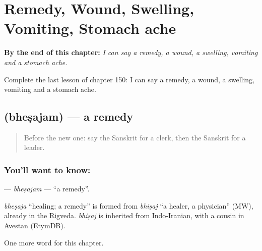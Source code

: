 
\chapter{Remedy, Wound, Swelling, Vomiting, Stomach ache}
\label{ch:sa-remedy-wound-swelling-vomiting-stomach-ache}

\begin{chapteropening}
\textbf{By the end of this chapter:} \emph{I can say a remedy, a wound, a swelling, vomiting and a stomach ache.}

Complete the last lesson of chapter 150: I can say a remedy, a wound, a swelling, vomiting and a stomach ache.
\end{chapteropening}

\section[\texorpdfstring{\sk{भेषजम्} (bheṣajam)}{भेषजम् (bheṣajam)}]{ (bheṣajam) — a remedy}

\label{lesson:SA-C150-bhesajam}



\begin{quote}
Before the new one: say the Sanskrit for a clerk, then the Sanskrit for a leader.
\end{quote}

\subsection*{You'll want to know: }
\textbf{} — \emph{bheṣajam} — \textquotedblleft{}a remedy\textquotedblright{}.

\begin{cousinweb}
\emph{bheṣaja} \textquotedblleft{}healing; a remedy\textquotedblright{} is formed from \emph{bhiṣaj} \textquotedblleft{}a healer, a physician\textquotedblright{} (MW), already in the Rigveda. \emph{bhiṣaj} is inherited from Indo-Iranian, with a cousin in Avestan (EtymDB).
\end{cousinweb}

\begin{grammarlens}[title={What you've built}]
One more word for this chapter.
\end{grammarlens}

